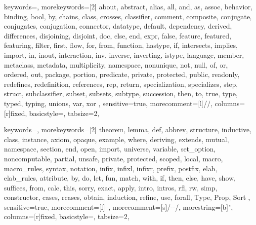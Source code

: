 \newcommand{\emptyclass}{\mc{\emptyset}}


\newcommand{\listingsize}{\footnotesize}
	{ 
	keywords={},
	morekeywords=[2]{ 
about, abstract, alias, all, and, as, assoc, behavior, binding, bool, by, chains, class, crosses,
classifier, comment, composite, conjugate, conjugates, conjugation, connector, datatype, 
default, dependency, derived, differences, disjoining, disjoint, doc, else, end, expr, 
false, feature, featured, featuring, filter, first, flow, for, from, function, hastype, if, 
intersects, implies, import, in, inout, interaction, inv, inverse, inverting, istype, 
language, member, metaclass, metadata, multiplicity, namespace, nonunique, not, null, of, 
or, ordered, out, package, portion, predicate, private, protected, public, readonly, 
redefines, redefinition, references, rep, return, specialization, specializes, step, 
struct, subclassifier, subset, subsets, subtype, succession, then, to, true, type, typed, 
typing, unions, var, xor
},
	sensitive=true,
	morecomment=[l]{//},
	columns=[r]fixed,
	basicstyle=\ttfamily\listingsize,
	tabsize=2,
	}
	

\newcommand{\lstk}[1]
{\lstset{language=kerml,basicstyle=\ttfamily\large}\lstinline{#1}\lstset{language=kerml,basicstyle=\ttfamily\listingsize}}

	{
	keywords={},
	morekeywords=[2]{
theorem, lemma, def, abbrev, structure, inductive, class, instance, axiom, opaque,
example, where, deriving, extends, mutual, namespace, section, end, open, import,
universe, variable, set_option, noncomputable, partial, unsafe, private, protected,
scoped, local, macro, macro_rules, syntax, notation, infix, infixl, infixr, prefix,
postfix, elab, elab_rules, attribute, by, do, let, fun, match, with, if, then, else,
have, show, suffices, from, calc, this, sorry, exact, apply, intro, intros, rfl, rw,
simp, constructor, cases, rcases, obtain, induction, refine, use, forall, Type, Prop,
Sort
},
	sensitive=true,
	morecomment=[l]{--},
	morecomment=[s]{/-}{-/},
	morestring=[b]",
	columns=[r]fixed,
	basicstyle=\ttfamily\listingsize,
	tabsize=2,
	}

